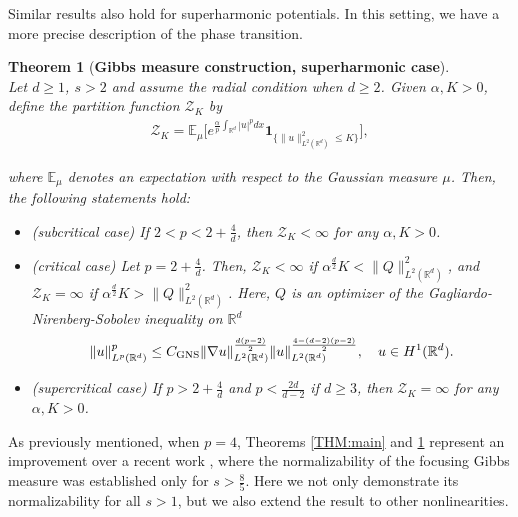\documentclass[%
11pt,  reqno]{amsart}
\newtheorem{theorem}{Theorem} [section]
\theoremstyle{remarkstyle}
\newcommand{\1}{\hspace{0.2mm}\text{I}\hspace{0.2mm}}
\newcommand{\noi}{\noindent}
\newcommand{\R}{\mathbb{R}}
\newcommand{\E}{\mathbb{E}}
\newcommand{\al}{\alpha}
\newcommand{\ind}{\mathbf 1}
\numberwithin{equation}{section}
\numberwithin{theorem}{section}
\begin{document}
	Similar results also hold for superharmonic potentials. In this setting, we have a more precise description of the phase transition.
	
	
	\begin{theorem}[\textbf{Gibbs measure construction, superharmonic case}]\label{THM:main1}\mbox{}\\
		Let $d\ge 1$, $s>2$ and assume the radial condition when $d\ge 2$.
		Given  $\al, K > 0$, define
		the partition function $\mathcal Z_{K}$ by 
		\begin{align}
			\label{Z1}
			\mathcal Z_{K} = \E_{\mu}
			\Big[e^{\frac{\al}{p} \int_{\R^d} |u|^p d x}\ind_{\{\|u\|^2_{L^2(\R^d)}\le K\}}\Big], 
		\end{align}
		
		\noi
		where $\E_{\mu}$ denotes an expectation with respect
		to the Gaussian measure $\mu$.
		Then, the following statements hold\textup{:}
		
		\smallskip
		
		\noi
		\begin{itemize}
			\item
			[\textup{(i)}] \textup{(subcritical case)}
			If $2< p< 2+\frac4d$, then $\mathcal Z_{K}<\infty$ for any $\al, K>0$.
			
			
			\smallskip
			
			
			\noi
			\item[\textup{(ii)}] \textup{(critical case)}
			Let $p= 2+\frac4d$.
			Then, $\mathcal Z_{K}<\infty$ if $\al^{\frac{d}2} K<\|Q\|^2_{L^2(\R^d)}$, and $\mathcal Z_{K}=\infty$ if $\al^{\frac{d}2}K>\|Q\|^2_{L^2(\R^d)}$. Here, $Q$ is an optimizer of the Gagliardo-Nirenberg-Sobolev inequality on $\R^d$ 
			\begin{align}\label{GNS}
				\|u\|^p_{L^p(\R^d)} \leq C_{\textup{GNS}} \|\nabla u\|_{L^2(\R^d)}^{\frac{d(p-2)}{2}} \|u\|_{L^2(\R^d)}^{\frac{4-(d-2)(p-2)}{2}}, \quad u \in H^1(\R^d).
			\end{align}
			
			\item[\textup{(iii)}]
			\textup{(supercritical case)}
			If $ p> 2+\frac4d$ and $p<\frac{2d}{d-2}$ if $d\ge 3$,
			then $\mathcal Z_{K} = \infty$ for any $\al, K >0$.
			
		\end{itemize}
	\end{theorem}
	
	
	As previously mentioned, when $p=4$, Theorems \ref{THM:main} and \ref{THM:main1} represent an improvement over a recent work \cite{DR23}, where the normalizability of the focusing Gibbs measure was established only for $s>\frac{8}{5}$. Here we not only demonstrate its normalizability for all $s>1$, but we also extend the result to other nonlinearities.
	
\end{document}
